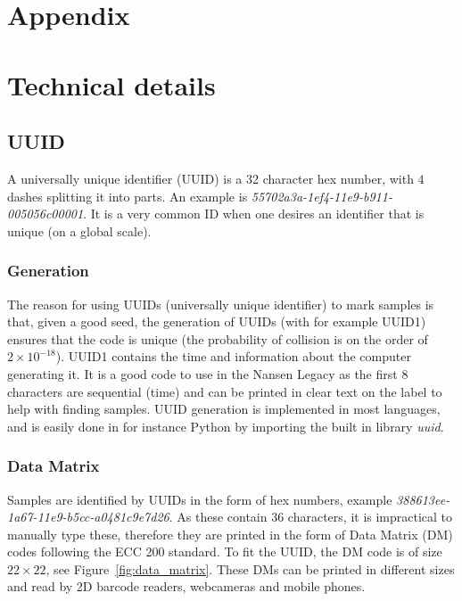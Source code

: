 \documentclass[a4paper,english, 11pt]{article}
\begin{document}

\clearpage
\newpage
\appendix
\section*{Appendix}

\section{Technical details} %
\label{sec:Technical details}

\subsection{UUID} %
\label{sub:UUID}

A universally unique identifier (UUID) is a 32 character hex number, with 4 dashes splitting it into parts. An example is \emph{55702a3a-1ef4-11e9-b911-005056c00001}. It is a very common ID when one desires an identifier that is unique (on a global scale).

\subsubsection{Generation} %
\label{ssub:Generation}

The reason for using UUIDs (universally unique identifier) to mark samples is that, given a good seed, the generation of UUIDs (with for example UUID1) ensures that the code is unique (the probability of collision is on the order of $ 2\times10^{-18}$). UUID1 contains the time and information about the computer generating it. It is a good code to use in the Nansen Legacy as the first 8 characters are sequential (time) and can be printed in clear text on the label to help with finding samples. UUID generation is implemented in most languages, and is easily done in for instance Python by importing the built in library \emph{uuid}. 


\subsubsection{Data Matrix} %
\label{ssub:DM}
Samples are identified by UUIDs in the form of hex numbers, example \emph{388613ee-1a67-11e9-b5cc-a0481c9e7d26}. As these contain 36 characters, it is impractical to manually type these, therefore they are printed in the form of  Data Matrix (DM) codes following the ECC 200 standard. To fit the UUID, the DM code is of size $22\times22$, see Figure~\ref{fig:data_matrix}. These DMs can be printed in different sizes and read by 2D barcode readers, webcameras and mobile phones. 
\end{document}
